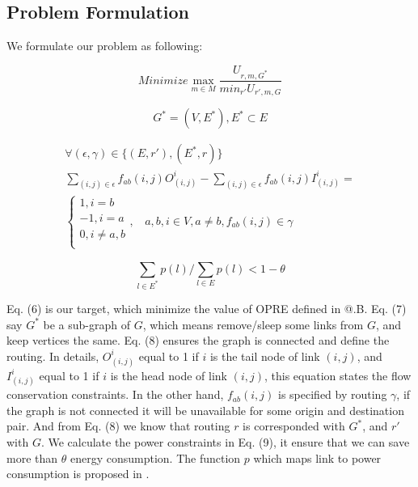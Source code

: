\documentclass[conference]{IEEEtran}
\makeatletter
\newcommand{\Rmnum}[1]{\expandafter\@slowromancap\romannumeral #1@}
\makeatother
\begin{document}
\subsection{Problem Formulation}
We formulate our problem as following:

\begin{equation}
Minimize \max_{m \in M} \frac{U_{r,m,G^*}} {min_{r'} U_{r', m, G}}
\end{equation}

\begin{equation}
    G^* = (V,E^*), E^* \subset E
\end{equation}

\begin{equation}
    \begin{split}
    \forall (\epsilon, \gamma) \in \{ (E, r'), (E^*, r)\} \\
    \sum_{(i,j) \in \epsilon}f_{ab}(i,j)O_{(i,j)}^i - \sum_{(i,j) \in \epsilon}f_{ab}(i,j)I_{(i,j)}^i = \\
    \left\{
        \begin{array}{c}
        1, i = b \\
        -1, i = a \\
        0, i \neq a,b \\
        \end{array}
    \right.
    , \ \ \ \ a,b,i \in V, a \neq b, f_{ab}(i,j) \in \gamma
    \end{split}
\end{equation}

\begin{equation}
    \sum_{l \in E^*} p(l) / \sum_{l \in E} p(l) < 1 - \theta
\end{equation}

Eq. (6) is our target, which minimize the value of OPRE defined in \Rmnum{3}.B. Eq. (7) say $G^*$ be a sub-graph of $G$, which means remove/sleep
some links from $G$, and keep vertices the same. Eq. (8) ensures the graph is connected and define the routing. In details, $O_{(i,j)}^i$ equal to
1 if $i$ is the tail node of link $(i,j)$, and $I_(i,j)^i$ equal to 1 if $i$ is the head node of link $(i,j)$, this equation states the flow 
conservation constraints. In the other hand, $f_{ab}(i,j)$ is specified by routing $\gamma$, if the graph is not connected it will be unavailable
for some origin and destination pair. And from Eq. (8) we know that routing $r$ is corresponded with $G^*$, and $r'$ with $G$. We calculate the 
power constraints in Eq. (9), it ensure that we can save more than $\theta$ energy consumption. The function $p$ which maps link to power consumption
is proposed in \cite{networking:greente}.
\end{document}
